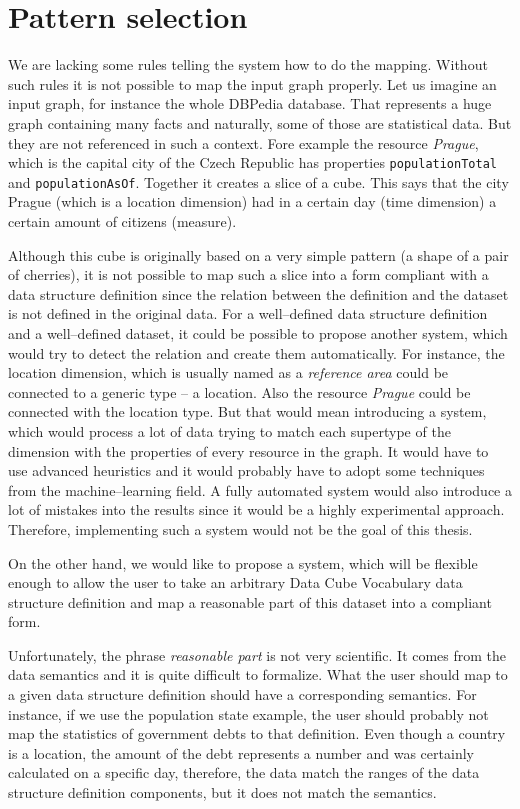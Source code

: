 \section{Pattern selection}
We are lacking some rules telling the system how to do the mapping. 
Without such rules it is not possible to map the input graph properly. Let us 
imagine an input graph, for instance the whole DBPedia database. That represents a huge graph 
containing many facts and naturally, some of those are statistical data. But they 
are not referenced in such a context. Fore example the resource \emph{Prague}, which is the 
capital city of the Czech Republic has properties \texttt{populationTotal} and
\texttt{populationAsOf}. Together it creates a slice of a cube. This says that the 
city Prague (which is a location dimension) had in a certain day (time dimension) 
a certain amount of citizens (measure).

Although this cube is originally based on a very simple pattern (a shape of a pair of cherries),
it is not possible to map such a slice into a form compliant with a 
data structure definition since the relation between the definition and the 
dataset is not defined in the original data. For a well--defined data structure 
definition and a well--defined dataset, it could be possible to propose another 
system, which would try to detect the relation and create them 
automatically. For instance, the location dimension, which is usually named as a
\emph{reference area} could be connected to a generic type -- a location.
Also the resource \emph{Prague} could be connected with the location type. But 
that would mean introducing a system, which would process a lot of data trying to 
match each supertype of the dimension with the properties of every resource in 
the graph. It would have to use advanced heuristics and it would probably have 
to adopt some techniques from the machine--learning field. A fully automated 
system would also introduce a lot of mistakes into the results since it would 
be a highly experimental approach. Therefore, implementing such a system would 
not be the goal of this thesis. 

On the other hand, we would like to propose a system, which will be flexible 
enough to allow the user to take an arbitrary Data Cube Vocabulary data 
structure definition and map a reasonable part of this dataset into a compliant 
form.

Unfortunately, the phrase \emph{reasonable part} is not very scientific. 
It comes from the data semantics and it is quite difficult to formalize. What 
the user should map to a given data structure definition should have 
a corresponding semantics. For instance, if we use the population state example, the 
user should probably not map the statistics of government debts to that 
definition. Even though a country is a location, the amount of the debt represents a 
number and was certainly calculated on a specific day, therefore, the 
data match the ranges of the data structure definition components, but it does 
not match the semantics.

